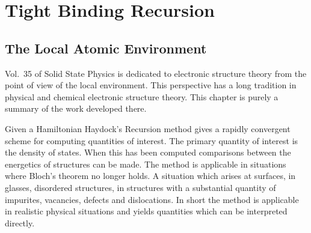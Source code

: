 \chapter{Tight Binding Recursion}
\label{chap:invariance}
\section{The Local Atomic Environment}
  Vol.~35 of Solid State Physics is dedicated to electronic structure
theory from the point of view of the local environment. This perspective
has a long tradition in physical and chemical electronic structure theory.
This chapter is purely a summary of the work developed there.

Given a Hamiltonian Haydock's Recursion method gives a rapidly convergent 
scheme for computing quantities of interest. The primary quantity of interest 
is the density of states. When this has been computed comparisons between the energetics of 
structures can be made. The method is applicable in situations where Bloch's theorem no longer holds.
A situation which arises at surfaces, in glasses, disordered structures, in structures with a substantial
quantity of impurites, vacancies, defects and dislocations. In short the method is applicable
in realistic physical situations and yields quantities which can be interpreted directly.


